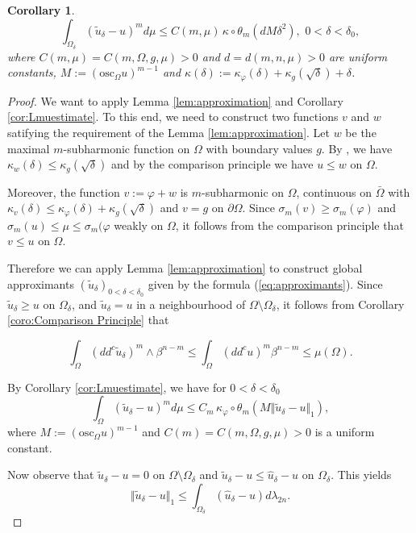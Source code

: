 \documentclass[12pt]{amsart}
\newtheorem{corollary}[theorem]{Corollary}
\theoremstyle{definition}
\numberwithin{theorem}{section}
\numberwithin{equation}{section}
\begin{document}
{\begin{corollary}
$$
\int_{\Omega_\delta} (\tilde{u}_\delta - u)^m d \mu  \leq C (m,\mu) \,  \kappa \circ \theta_m( d M\delta^2), \, \, 0 < \delta < \delta_0,
$$
where $C(m,\mu) = C (m,\Omega,g, \mu) >0$ and $d = d(m,n,\mu) > 0$ are uniform constants, $ M := (\text{osc}_{\Omega} u)^{m -1}$ and $\kappa(\delta) := \kappa_\varphi(\delta) + \kappa_g(\sqrt{\delta}) + \delta$.  
\end{corollary}


\begin{proof}
We want to apply Lemma \ref{lem:approximation} and  Corollary  \ref{cor:Lmuestimate}. To this end, we need to construct two functions $v$ and $w$ satifying the requirement of the Lemma \ref{lem:approximation}.  Let $w$ be the maximal $m$-subharmonic function on $\Omega$ with boundary values $g$. By \cite{Ch16b}, we have $\kappa_w  (\delta) \leq \kappa_g (\sqrt{\delta})$ and by the comparison principle we have $u \leq w$ on $\Omega$.   

 Moreover,  the function $v := \varphi + w$ is $m$-subharmonic on $\Omega$, continuous on $\bar{\Omega}$ with $\kappa_v (\delta)  \leq \kappa_\varphi (\delta)  + \kappa_g (\sqrt{\delta})$ and $v = g$ on $\partial \Omega$. Since   $ \sigma_m (v) \geq \sigma_m (\varphi) $ and $\sigma_m (u) \leq \mu \leq \sigma_m (\varphi$ weakly on $\Omega$, it follows from the comparison principle that
$v \leq u$ on $\Omega$.

 Therefore we can apply Lemma \ref{lem:approximation} to construct  global approximants $ (\tilde{u}_\delta)_{0 < \delta < \delta_0} $  given by the formula (\ref{eq:approximants}). Since  $ \tilde{u}_\delta  \geq  u$ on $\Omega_\delta$, and $\tilde{u}_\delta = u$ in a neighbourhood of $\Omega \setminus \Omega_\delta$,  it follows from Corollary \ref{coro:Comparison Principle} that 
 
 
  $$
 \int_{\Omega} (dd^c \tilde{u}_\delta)^m \wedge \beta^{n-m} \leq  \int_{\Omega} (dd^c u)^m \beta^{n-m} \leq \mu (\Omega).
 $$
 

  By Corollary  \ref{cor:Lmuestimate}, we have for $0 < \delta < \delta_0$
 $$
 \int_{\Omega } (\tilde{u}_{\delta} - u)^m d\mu \leq C_m \,  \kappa_{\varphi}  \circ \theta_m  (M \Vert \widetilde u_{\delta} - u\Vert_1),
 $$
 where $M := (\text{osc}_{\Omega} u)^{m -1}$ and  $C(m) = C (m,\Omega,g, \mu) >0$ is a uniform constant.
 
 Now observe that $\tilde{u}_{\delta} - u = 0$ on $\Omega \setminus \Omega_\delta$ and  $\tilde{u}_{\delta} - u \leq \widehat{u}_\delta - u$ on $\Omega_\delta$. This yields 
 $$
 \Vert \tilde{u}_{\delta} - u \Vert_1 \leq \int_{\Omega_\delta} (\widehat{u}_\delta - u) d \lambda_{2n}.
 $$


\end{proof}}
\end{document}
